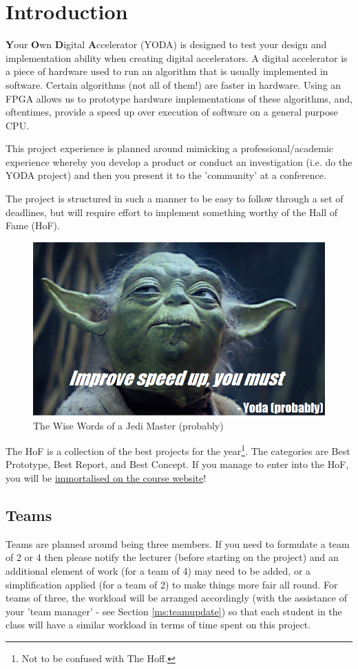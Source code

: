 \section{Introduction}
\textbf{Y}our \textbf{O}wn \textbf{D}igital \textbf{A}ccelerator (YODA) is designed to test your design and implementation ability when creating digital accelerators. A digital accelerator is a piece of hardware used to run an algorithm that is usually implemented in software. Certain algorithms (not all of them!) are faster in hardware. Using an FPGA allows us to prototype hardware implementations of these algorithms, and, oftentimes, provide a speed up over execution of software on a general purpose CPU.

This project experience is planned around mimicking a professional/academic experience whereby you develop a product or conduct an investigation (i.e. do the YODA project) and then you present it to the 'community' at a conference.

The project is structured in such a manner to be easy to follow through a set of deadlines, but will require effort to implement something worthy of the Hall of Fame (HoF).

\begin{figure}[H]
\centering
\includegraphics[width=0.7\columnwidth]{Figures/yoda}
\caption{The Wise Words of a Jedi Master (probably)}
\end{figure}

The HoF is a collection of the best projects for the year\footnote{Not to be confused with The Hoff.}. The categories are Best Prototype, Best Report, and Best Concept. If you manage to enter into the HoF, you will be \href{http://ocw.ee.uct.ac.za/courses/EEE4120F/HOF.html}{immortalised on the course website}! 

\subsection{Teams}
Teams are planned around being three members. If you need to formulate a team of 2 or 4 then please notify the lecturer (before starting on the project) and an additional element of work (for a team of 4) may need to be added, or a simplification applied (for a team of 2) to make things more fair all round. For teams of three, the workload will be arranged accordingly (with the assistance of your 'team manager' - see Section \ref{ms:teamupdate}) so that each student in the class will have a similar workload in terms of time spent on this project.

